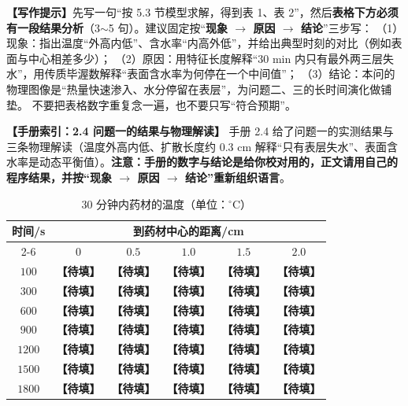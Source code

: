 \documentclass[12pt,a4paper]{article}
\newcommand{\prompt}[1]{\par\noindent\textbf{【写作提示】}#1\par}      %
\newcommand{\ph}[1]{\textbf{【#1】}}                                   %
\newcommand{\handbook}[2]{\par\noindent\textbf{【手册索引：#1】} #2\par}
\begin{document}
\prompt{先写一句“按 5.3 节模型求解，得到表 1、表 2”，然后\textbf{表格下方必须有一段结果分析}（3$\sim$5 句）。建议固定按“\textbf{现象 $\rightarrow$ 原因 $\rightarrow$ 结论}”三步写：
（1）现象：指出温度“外高内低”、含水率“内高外低”，并给出典型时刻的对比（例如表面与中心相差多少）；
（2）原因：用特征长度解释“30 min 内只有最外两三层失水”，用传质毕渥数解释“表面含水率为何停在一个中间值”；
（3）结论：本问的物理图像是“热量快速渗入、水分停留在表层”，为问题二、三的长时间演化做铺垫。
不要把表格数字重复念一遍，也不要只写“符合预期”。}

\handbook{2.4 问题一的结果与物理解读}{手册 2.4 给了问题一的实测结果与三条物理解读（温度外高内低、扩散长度约 $0.3$ cm 解释“只有表层失水”、表面含水率是动态平衡值）。\textbf{注意：手册的数字与结论是给你校对用的，正文请用自己的程序结果，并按“现象 $\rightarrow$ 原因 $\rightarrow$ 结论”重新组织语言}。}

\begin{table}[H]
\centering
\caption{30 分钟内药材的温度（单位：$^\circ$C）}
\label{tab:q1-temperature}
\begin{tabular}{cccccc}
\toprule
\multirow{2}{*}{时间/s} & \multicolumn{5}{c}{到药材中心的距离/cm}\\
\cmidrule(lr){2-6}
 & $0$ & $0.5$ & $1.0$ & $1.5$ & $2.0$\\
\midrule
$100$  & \ph{待填} & \ph{待填} & \ph{待填} & \ph{待填} & \ph{待填}\\
$300$  & \ph{待填} & \ph{待填} & \ph{待填} & \ph{待填} & \ph{待填}\\
$600$  & \ph{待填} & \ph{待填} & \ph{待填} & \ph{待填} & \ph{待填}\\
$900$  & \ph{待填} & \ph{待填} & \ph{待填} & \ph{待填} & \ph{待填}\\
$1200$ & \ph{待填} & \ph{待填} & \ph{待填} & \ph{待填} & \ph{待填}\\
$1500$ & \ph{待填} & \ph{待填} & \ph{待填} & \ph{待填} & \ph{待填}\\
$1800$ & \ph{待填} & \ph{待填} & \ph{待填} & \ph{待填} & \ph{待填}\\
\bottomrule
\end{tabular}
\end{table}
\end{document}
